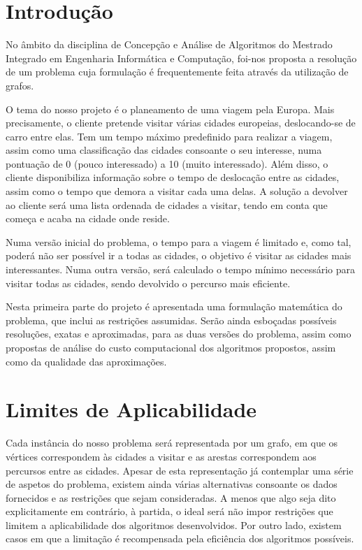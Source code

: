 \documentclass[12pt,a4paper,reqno]{report}
\numberwithin{figure}{section}
\numberwithin{equation}{section}
\numberwithin{figure}{section}
\numberwithin{equation}{section}
\begin{document}


\tableofcontents


\chapter{Introdução}

No âmbito da disciplina de Concepção e Análise de Algoritmos do Mestrado Integrado em Engenharia Informática e Computação, foi-nos proposta a resolução de um problema cuja formulação é frequentemente feita através da utilização de grafos.

O tema do nosso projeto é o planeamento de uma viagem pela Europa. Mais precisamente, o cliente pretende visitar várias cidades europeias, deslocando-se de carro entre elas. Tem um tempo máximo predefinido para realizar a viagem, assim como uma classificação das cidades consoante o seu interesse, numa pontuação de 0 (pouco interessado) a 10 (muito interessado). Além disso, o cliente disponibiliza informação sobre o tempo de deslocação entre as cidades, assim como o tempo que demora a visitar cada uma delas. A solução a devolver ao cliente será uma lista ordenada de cidades a visitar, tendo em conta que começa e acaba na cidade onde reside.

Numa versão inicial do problema, o tempo para a viagem é limitado e, como tal, poderá não ser possível ir a todas as cidades, o objetivo é visitar as cidades mais interessantes. Numa outra versão, será calculado o tempo mínimo necessário para visitar todas as cidades, sendo devolvido o percurso mais eficiente.

Nesta primeira parte do projeto é apresentada uma formulação matemática do problema, que inclui as restrições assumidas. Serão ainda esboçadas possíveis resoluções, exatas e aproximadas, para as duas versões do problema, assim como propostas de análise do custo computacional dos algoritmos propostos, assim como da qualidade das aproximações.


\chapter{Limites de Aplicabilidade}

Cada instância do nosso problema será representada por um grafo, em que os vértices correspondem às cidades a visitar e as arestas correspondem aos percursos entre as cidades. Apesar de esta representação já contemplar uma série de aspetos do problema, existem ainda várias alternativas consoante os dados fornecidos e as restrições que sejam consideradas. A menos que algo seja dito explicitamente em contrário, à partida, o ideal será não impor restrições que limitem a aplicabilidade dos algoritmos desenvolvidos. Por outro lado, existem casos em que a limitação é recompensada pela eficiência dos algoritmos possíveis.
\end{document}
